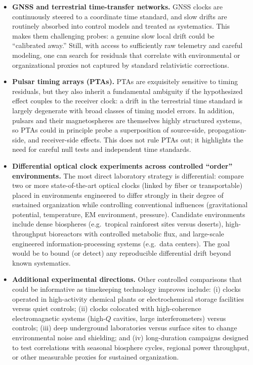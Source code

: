 \documentclass[10pt]{article}
\begin{document}
\begin{itemize}[leftmargin=1.2em]
\item \textbf{GNSS and terrestrial time-transfer networks.} GNSS clocks are continuously steered to a
coordinate time standard, and slow drifts are routinely absorbed into control models and treated as
systematics. This makes them challenging probes: a genuine slow local drift could be ``calibrated
away.'' Still, with access to sufficiently raw telemetry and careful modeling, one can search for
residuals that correlate with environmental or organizational proxies not captured by standard
relativistic corrections.

\item \textbf{Pulsar timing arrays (PTAs).} PTAs are exquisitely sensitive to timing residuals, but
they also inherit a fundamental ambiguity if the hypothesized effect couples to the receiver clock:
a drift in the terrestrial time standard is largely degenerate with broad classes of timing model
errors. In addition, pulsars and their magnetospheres are themselves highly structured systems, so
PTAs could in principle probe a superposition of source-side, propagation-side, and receiver-side
effects. This does not rule PTAs out; it highlights the need for careful null tests and independent
time standards.

\item \textbf{Differential optical clock experiments across controlled ``order'' environments.}
The most direct laboratory strategy is differential: compare two or more state-of-the-art optical
clocks (linked by fiber or transportable) placed in environments engineered to differ strongly in
their degree of sustained organization while controlling conventional influences (gravitational
potential, temperature, EM environment, pressure). Candidate environments include dense biospheres
(e.g.\ tropical rainforest sites versus deserts), high-throughput bioreactors with controlled
metabolic flux, and large-scale engineered information-processing systems (e.g.\ data centers).
The goal would be to bound (or detect) any reproducible differential drift beyond known systematics.

\item \textbf{Additional experimental directions.}
Other controlled comparisons that could be informative as timekeeping technology improves include:
(i) clocks operated in high-activity chemical plants or electrochemical storage facilities versus
quiet controls; (ii) clocks colocated with high-coherence electromagnetic systems (high-$Q$ cavities,
large interferometers) versus controls; (iii) deep underground laboratories versus surface sites to
change environmental noise and shielding; and (iv) long-duration campaigns designed to test
correlations with seasonal biosphere cycles, regional power throughput, or other measurable proxies
for sustained organization.
\end{itemize}
\end{document}
